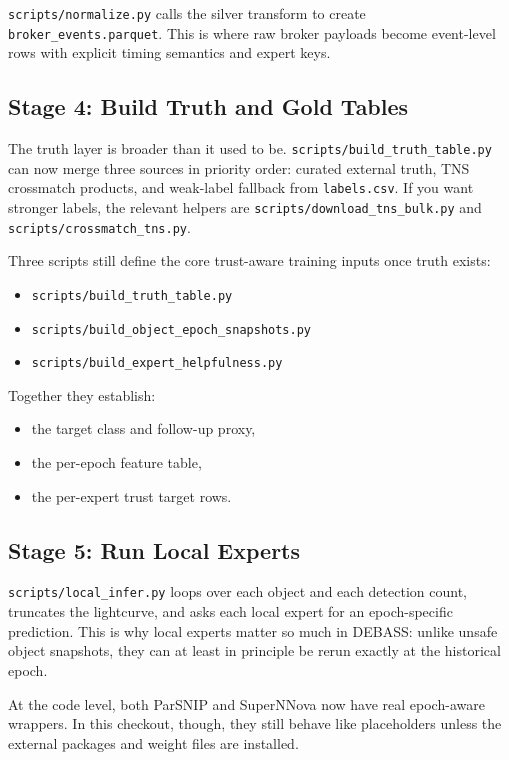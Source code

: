 \documentclass[11pt]{article}
\newcommand{\code}[1]{\texttt{#1}}
\begin{document}
\code{scripts/normalize.py} calls the silver transform to create \code{broker\_events.parquet}. This is where raw broker payloads become event-level rows with explicit timing semantics and expert keys.

\subsection{Stage 4: Build Truth and Gold Tables}

The truth layer is broader than it used to be. \code{scripts/build\_truth\_table.py} can now merge three sources in priority order: curated external truth, TNS crossmatch products, and weak-label fallback from \code{labels.csv}. If you want stronger labels, the relevant helpers are \code{scripts/download\_tns\_bulk.py} and \code{scripts/crossmatch\_tns.py}.

Three scripts still define the core trust-aware training inputs once truth exists:

\begin{itemize}
\item \code{scripts/build\_truth\_table.py}
\item \code{scripts/build\_object\_epoch\_snapshots.py}
\item \code{scripts/build\_expert\_helpfulness.py}
\end{itemize}

Together they establish:

\begin{itemize}
\item the target class and follow-up proxy,
\item the per-epoch feature table,
\item the per-expert trust target rows.
\end{itemize}

\subsection{Stage 5: Run Local Experts}

\code{scripts/local\_infer.py} loops over each object and each detection count, truncates the lightcurve, and asks each local expert for an epoch-specific prediction. This is why local experts matter so much in DEBASS: unlike unsafe object snapshots, they can at least in principle be rerun exactly at the historical epoch.

At the code level, both ParSNIP and SuperNNova now have real epoch-aware wrappers. In this checkout, though, they still behave like placeholders unless the external packages and weight files are installed.
\end{document}
